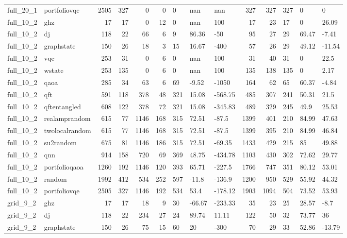 \begin{longtable}{llrrrrlllrrlll}
full\_20\_1 & portfoliovqe & 2505 & 327 & 0 & 0 & 0 & nan & nan & 327 & 327 & 327 & 0 & 0 \\
full\_10\_2 & ghz & 17 & 17 & 0 & 12 & 0 & nan & 100 & 17 & 23 & 17 & 0 & 26.09 \\
full\_10\_2 & dj & 118 & 22 & 66 & 6 & 9 & 86.36 & -50 & 95 & 27 & 29 & 69.47 & -7.41 \\
full\_10\_2 & graphstate & 150 & 26 & 18 & 3 & 15 & 16.67 & -400 & 57 & 26 & 29 & 49.12 & -11.54 \\
full\_10\_2 & vqe & 253 & 31 & 0 & 6 & 0 & nan & 100 & 31 & 40 & 31 & 0 & 22.5 \\
full\_10\_2 & wstate & 253 & 135 & 0 & 6 & 0 & nan & 100 & 135 & 138 & 135 & 0 & 2.17 \\
full\_10\_2 & qaoa & 285 & 34 & 63 & 6 & 69 & -9.52 & -1050 & 164 & 62 & 65 & 60.37 & -4.84 \\
full\_10\_2 & qft & 591 & 118 & 378 & 48 & 321 & 15.08 & -568.75 & 485 & 307 & 241 & 50.31 & 21.5 \\
full\_10\_2 & qftentangled & 608 & 122 & 378 & 72 & 321 & 15.08 & -345.83 & 489 & 329 & 245 & 49.9 & 25.53 \\
full\_10\_2 & realamprandom & 615 & 77 & 1146 & 168 & 315 & 72.51 & -87.5 & 1399 & 401 & 210 & 84.99 & 47.63 \\
full\_10\_2 & twolocalrandom & 615 & 77 & 1146 & 168 & 315 & 72.51 & -87.5 & 1399 & 395 & 210 & 84.99 & 46.84 \\
full\_10\_2 & su2random & 675 & 81 & 1146 & 186 & 315 & 72.51 & -69.35 & 1433 & 429 & 215 & 85 & 49.88 \\
full\_10\_2 & qnn & 914 & 158 & 720 & 69 & 369 & 48.75 & -434.78 & 1103 & 430 & 302 & 72.62 & 29.77 \\
full\_10\_2 & portfolioqaoa & 1260 & 192 & 1146 & 120 & 393 & 65.71 & -227.5 & 1766 & 747 & 351 & 80.12 & 53.01 \\
full\_10\_2 & random & 1992 & 412 & 534 & 252 & 597 & -11.8 & -136.9 & 1200 & 950 & 529 & 55.92 & 44.32 \\
full\_10\_2 & portfoliovqe & 2505 & 327 & 1146 & 192 & 534 & 53.4 & -178.12 & 1903 & 1094 & 504 & 73.52 & 53.93 \\
grid\_9\_2 & ghz & 17 & 17 & 18 & 9 & 30 & -66.67 & -233.33 & 35 & 23 & 25 & 28.57 & -8.7 \\
grid\_9\_2 & dj & 118 & 22 & 234 & 27 & 24 & 89.74 & 11.11 & 122 & 50 & 32 & 73.77 & 36 \\
grid\_9\_2 & graphstate & 150 & 26 & 75 & 15 & 60 & 20 & -300 & 70 & 29 & 33 & 52.86 & -13.79 \\

\end{longtable}
